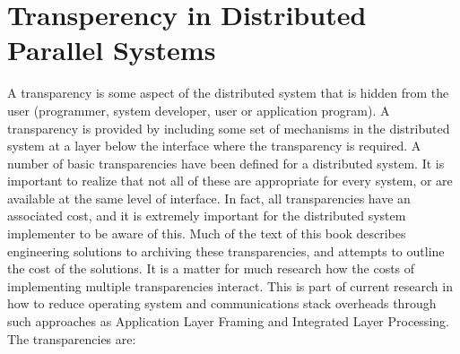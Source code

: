 \section{Transperency in Distributed Parallel Systems}
 A transparency is some aspect of the distributed system that is hidden from the user (programmer, system developer, user or application program). A transparency is provided by including some set of mechanisms in the distributed system at a layer below the interface where the transparency is required. A number of basic transparencies have been defined for a distributed system. It is important to realize that not all of these are appropriate for every system, or are available at the same level of interface. In fact, all transparencies have an associated cost, and it is extremely important for the distributed system implementer to be aware of this. Much of the text of this book describes engineering solutions to archiving these transparencies, and attempts to outline the cost of the solutions. It is a matter for much research how the costs of implementing multiple transparencies interact. This is part of current research in how to reduce operating system and communications stack overheads through such approaches as Application Layer Framing and Integrated Layer Processing. The transparencies are: 
